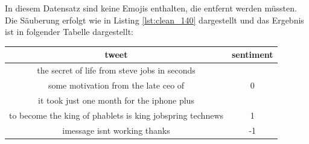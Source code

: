 In diesem Datensatz sind keine Emojis enthalten, die entfernt werden m\"ussten. Die S\"auberung erfolgt wie in Listing \ref{lst:clean_140} dargestellt und das Ergebnis ist in folgender Tabelle dargestellt:

\begin{center}
\begin{tabular}{|c|c|}
\hline
tweet & sentiment\\ 
\hline\hline
the secret of life from steve jobs in    seconds& \\ some motivation from the late ceo of&0\\
\hline
it took just one month for the iphone plus& \\to become the king of phablets  is king  jobspring technews&1\\
\hline
imessage isnt working thanks&-1\\
\hline    
\end{tabular}
\end{center}


